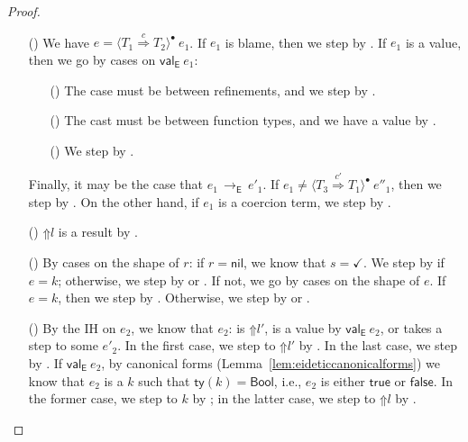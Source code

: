 \documentclass[9pt]{extarticle}
\newcommand{\ottnt}[1]{\mathit{#1}}
\newcommand{\ottsym}[1]{#1}
\begin{document}
\begin{lemma}
\begin{proof}
{\begin{itemize}
    \item[(\T{Coerce})] We have $\ottnt{e}  \ottsym{=}   \langle  \ottnt{T_{{\mathrm{1}}}}  \mathord{ \overset{ \ottnt{c} }{\Rightarrow} }  \ottnt{T_{{\mathrm{2}}}}  \rangle^{\bullet} ~  \ottnt{e_{{\mathrm{1}}}} $. If $\ottnt{e_{{\mathrm{1}}}}$ is
      blame, then we step by .
If $\ottnt{e_{{\mathrm{1}}}}$ is a value, then we go by cases on $ \mathsf{val} _{  \mathsf{E}  }~ \ottnt{e_{{\mathrm{1}}}} $:
\begin{itemize}
      \item[(\V{Const})] The case must be between refinements, and we
        step by .
      \item[(\V{Abs})] The cast must be between function types, and we
        have a value by .
      \item[(\V{ProxyE})] We step by \ECastMerge.
      \end{itemize}
Finally, it may be the case that $\ottnt{e_{{\mathrm{1}}}} \,  \longrightarrow _{  \mathsf{E}  }  \, \ottnt{e'_{{\mathrm{1}}}}$.
If $\ottnt{e_{{\mathrm{1}}}}  \neq   \langle  \ottnt{T_{{\mathrm{3}}}}  \mathord{ \overset{ \ottnt{c'} }{\Rightarrow} }  \ottnt{T_{{\mathrm{1}}}}  \rangle^{\bullet} ~  \ottnt{e''_{{\mathrm{1}}}} $, then we step by
      \ECastInner.
On the other hand, if $\ottnt{e_{{\mathrm{1}}}}$ is a coercion term, we step by
      \ECastMerge.

    \item[(\T{Blame})] $ \mathord{\Uparrow}  \ottnt{l} $ is a result by .

    \item[(\T{Stack})] By cases on the shape of $\ottnt{r}$: if $\ottnt{r}  \ottsym{=}  \mathsf{nil}$, we know that $\ottnt{s}  \ottsym{=}   \mathord{\checkmark} $. We step by  if
      $\ottnt{e}  \ottsym{=}  \ottnt{k}$; otherwise, we step by  or
      . If not, we go by cases on the shape of
      $\ottnt{e}$. If $\ottnt{e}  \ottsym{=}  \ottnt{k}$, then we step by . Otherwise,
      we step by  or .

    \item[(\T{Check})] By the IH on $\ottnt{e_{{\mathrm{2}}}}$, we know that $\ottnt{e_{{\mathrm{2}}}}$:
      is $ \mathord{\Uparrow}  \ottnt{l'} $, is a value by $ \mathsf{val} _{  \mathsf{E}  }~ \ottnt{e_{{\mathrm{2}}}} $, or takes a
      step to some $\ottnt{e'_{{\mathrm{2}}}}$. In the first case, we step to
      $ \mathord{\Uparrow}  \ottnt{l'} $ by . In the last case, we step by
      . If $ \mathsf{val} _{  \mathsf{E}  }~ \ottnt{e_{{\mathrm{2}}}} $, by canonical forms
      (Lemma~\ref{lem:eideticcanonicalforms}) we know that $\ottnt{e_{{\mathrm{2}}}}$ is
      a $\ottnt{k}$ such that $ \mathsf{ty} ( \ottnt{k} )   \ottsym{=}   \mathsf{Bool} $, i.e., $\ottnt{e_{{\mathrm{2}}}}$ is either
      $ \mathsf{true} $ or $ \mathsf{false} $. In the former case, we step to
      $\ottnt{k}$ by ; in the latter case, we step to
      $ \mathord{\Uparrow}  \ottnt{l} $ by .


\end{itemize}}
\end{proof}
\end{lemma}
\end{document}
